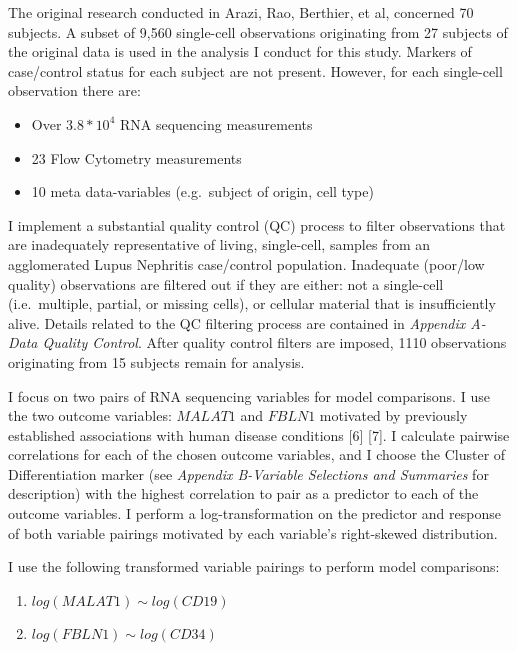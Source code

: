 \documentclass[12pt,]{article}
\providecommand{\tightlist}{%
  \setlength{\itemsep}{0pt}\setlength{\parskip}{0pt}}
\begin{document}
The original research conducted in Arazi, Rao, Berthier, et al,
concerned 70 subjects. A subset of 9,560 single-cell observations
originating from 27 subjects of the original data is used in the
analysis I conduct for this study. Markers of case/control status for
each subject are not present. However, for each single-cell observation
there are:

\begin{itemize}
\tightlist
\item
  Over \(3.8*10^{4}\) RNA sequencing measurements
\item
  23 Flow Cytometry measurements
\item
  10 meta data-variables (e.g.~subject of origin, cell type)
\end{itemize}

I implement a substantial quality control (QC) process to filter
observations that are inadequately representative of living,
single-cell, samples from an agglomerated Lupus Nephritis case/control
population. Inadequate (poor/low quality) observations are filtered out
if they are either: not a single-cell (i.e.~multiple, partial, or
missing cells), or cellular material that is insufficiently alive.
Details related to the QC filtering process are contained in
\textit{Appendix A-Data Quality Control}. After quality control filters
are imposed, 1110 observations originating from 15 subjects remain for
analysis.

I focus on two pairs of RNA sequencing variables for model comparisons.
I use the two outcome variables: \(MALAT1\) and \(FBLN1\) motivated by
previously established associations with human disease conditions
{[}6{]} {[}7{]}. I calculate pairwise correlations for each of the
chosen outcome variables, and I choose the Cluster of Differentiation
marker (see \textit{Appendix B-Variable Selections and Summaries} for
description) with the highest correlation to pair as a predictor to each
of the outcome variables. I perform a log-transformation on the
predictor and response of both variable pairings motivated by each
variable's right-skewed distribution.

I use the following transformed variable pairings to perform model
comparisons:

\begin{enumerate}
\def\labelenumi{\arabic{enumi}.}
\tightlist
\item
  \(log(MALAT1) \sim log(CD19)\)
\item
  \(log(FBLN1) \sim log(CD34)\)
\end{enumerate}
\end{document}
